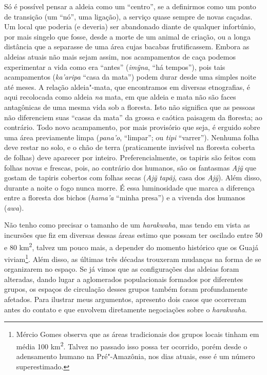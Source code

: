 Só é possível pensar a aldeia como um ``centro'', se a definirmos como um
ponto de transição (um ``nó'', uma ligação), a serviço quase sempre de
novas caçadas. Um local que poderia (e deveria) ser abandonado diante de
qualquer infortúnio, por mais singelo que fosse, desde a morte de um
animal de criação, ou a longa distância que a separasse de uma área
cujas bacabas frutificassem. Embora as aldeias atuais não mais sejam
assim, nos acampamentos de caça podemos experimentar a vida como era
``antes'' (\emph{imỹna}, ``há tempos''), pois tais acampamentos
(\emph{ka'aripa} ``casa da mata'') podem durar desde uma simples noite até
meses. A relação aldeia"-mata, que encontramos em diversas etnografias, é
aqui recolocada como aldeia \emph{na} mata, em que aldeia e mata não são
faces antagônicas de uma mesma vida sob a floresta. Isto não significa
que as pessoas não diferenciem suas ``casas da mata'' da grossa e caótica
paisagem da floresta; ao contrário. Todo novo acampamento, por mais
provisório que seja, é erguido sobre uma área previamente limpa
(\emph{pana'o}, ``limpar''; ou \emph{tipi} ``varrer''). Nenhuma folha deve
restar no solo, e o chão de terra (praticamente invisível na floresta
coberta de folhas) deve aparecer por inteiro. Preferencialmente, os
tapiris são feitos com folhas novas e frescas, pois, ao contrário dos
humanos, são os fantasmas \emph{Ajỹ} que gostam de tapiris cobertos com
folhas secas (\emph{Ajỹ} \emph{tapãj}, casa dos \emph{Ajỹ}). Além
disso, durante a noite o fogo nunca morre. É essa luminosidade que marca
a diferença entre a floresta dos bichos (\emph{hama'a} ``minha presa'') e
a vivenda dos humanos (\emph{awa}).

Não tenho como precisar o tamanho de um \emph{harakwaha}, mas tendo em
vista as incursões que fiz em diversas dessas áreas estimo que possam
ter oscilado entre 50 e 80 km\textsuperscript{2}, talvez um pouco mais,
a depender do momento histórico que os Guajá viviam\footnote{Mércio
  Gomes observa que as áreas tradicionais dos grupos locais tinham em
  média 100 km\textsuperscript{2}. Talvez no passado isso possa ter
  ocorrido, porém desde o adensamento humano na Pré"-Amazônia, nos dias
  atuais, esse é um número superestimado.}. Além disso, as últimas três
décadas trouxeram mudanças na forma de se organizarem no espaço. Se já
vimos que as configurações das aldeias foram alteradas, dando lugar a
aglomerados populacionais formados por diferentes grupos, os espaços de
circulação desses grupos também foram profundamente afetados. Para
ilustrar meus argumentos, apresento dois casos que ocorreram antes do
contato e que envolvem diretamente negociações sobre o \emph{harakwaha}.

